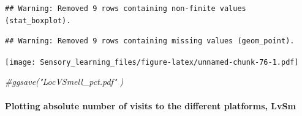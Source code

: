 \documentclass[]{article}
\newenvironment{Shaded}{\begin{snugshade}}{\end{snugshade}}
\newcommand{\CommentTok}[1]{\textcolor[rgb]{0.56,0.35,0.01}{\textit{{#1}}}}
\let\oldparagraph\paragraph
\renewcommand{\paragraph}[1]{\oldparagraph{#1}\mbox{}}
\begin{document}
\begin{verbatim}
## Warning: Removed 9 rows containing non-finite values (stat_boxplot).
\end{verbatim}

\begin{verbatim}
## Warning: Removed 9 rows containing missing values (geom_point).
\end{verbatim}

\texttt{[image: Sensory\_learning\_files/figure-latex/unnamed-chunk-76-1.pdf]}

\begin{Shaded}
\begin{Highlighting}[]
\CommentTok{#ggsave("LocVSmell_pct.pdf" )}
\end{Highlighting}
\end{Shaded}

\paragraph{Plotting absolute number of visits to the different
platforms,
LvSm}\label{plotting-absolute-number-of-visits-to-the-different-platforms-lvsm}
\end{document}
